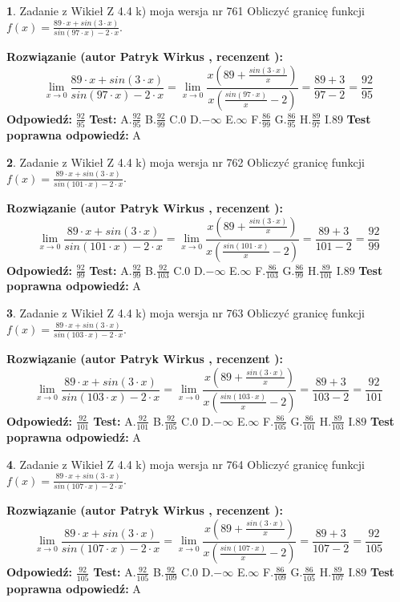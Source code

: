 \documentclass[12pt, a4paper]{article}
\theoremstyle{definition} %
\newtheorem{zad}{}
\newcommand{\zadStart}[1]{\begin{zad}#1\newline}
\newcommand{\zadStop}{\end{zad}}
\newcommand{\rozwStart}[2]{\noindent \textbf{Rozwiązanie (autor #1 , recenzent #2): }\newline}
\newcommand{\rozwStop}{\newline}
\newcommand{\odpStart}{\noindent \textbf{Odpowiedź:}\newline}
\newcommand{\odpStop}{\newline}
\newcommand{\testStart}{\noindent \textbf{Test:}\newline}
\newcommand{\testStop}{\newline}
\newcommand{\kluczStart}{\noindent \textbf{Test poprawna odpowiedź:}\newline}
\newcommand{\kluczStop}{\newline}
\begin{document}
\zadStart{Zadanie z Wikieł Z 4.4 k) moja wersja nr 761}
Obliczyć granicę funkcji $f(x)=\frac{89\cdot x +sin(3\cdot x)}{sin(97\cdot x) -2\cdot x}$.
\zadStop
\rozwStart{Patryk Wirkus}{}
$$\lim\limits_{x\to 0}\frac{89\cdot x +sin(3\cdot x)}{sin(97\cdot x) -2\cdot x}
=\lim\limits_{x\to 0}\frac{x(89+\frac{sin(3\cdot x)}{x})}{x(\frac{sin(97\cdot x)}{x}-2)}
=\frac{89+3}{97-2} = \frac{92}{95}$$
\rozwStop
\odpStart
$\frac{92}{95}$
\odpStop
\testStart
A.$\frac{92}{95}$
B.$\frac{92}{99}$
C.$0$
D.$-\infty$
E.$\infty$
F.$\frac{86}{99}$
G.$\frac{86}{95}$
H.$\frac{89}{97}$
I.$89$
\testStop
\kluczStart
A
\kluczStop



\zadStart{Zadanie z Wikieł Z 4.4 k) moja wersja nr 762}
Obliczyć granicę funkcji $f(x)=\frac{89\cdot x +sin(3\cdot x)}{sin(101\cdot x) -2\cdot x}$.
\zadStop
\rozwStart{Patryk Wirkus}{}
$$\lim\limits_{x\to 0}\frac{89\cdot x +sin(3\cdot x)}{sin(101\cdot x) -2\cdot x}
=\lim\limits_{x\to 0}\frac{x(89+\frac{sin(3\cdot x)}{x})}{x(\frac{sin(101\cdot x)}{x}-2)}
=\frac{89+3}{101-2} = \frac{92}{99}$$
\rozwStop
\odpStart
$\frac{92}{99}$
\odpStop
\testStart
A.$\frac{92}{99}$
B.$\frac{92}{103}$
C.$0$
D.$-\infty$
E.$\infty$
F.$\frac{86}{103}$
G.$\frac{86}{99}$
H.$\frac{89}{101}$
I.$89$
\testStop
\kluczStart
A
\kluczStop



\zadStart{Zadanie z Wikieł Z 4.4 k) moja wersja nr 763}
Obliczyć granicę funkcji $f(x)=\frac{89\cdot x +sin(3\cdot x)}{sin(103\cdot x) -2\cdot x}$.
\zadStop
\rozwStart{Patryk Wirkus}{}
$$\lim\limits_{x\to 0}\frac{89\cdot x +sin(3\cdot x)}{sin(103\cdot x) -2\cdot x}
=\lim\limits_{x\to 0}\frac{x(89+\frac{sin(3\cdot x)}{x})}{x(\frac{sin(103\cdot x)}{x}-2)}
=\frac{89+3}{103-2} = \frac{92}{101}$$
\rozwStop
\odpStart
$\frac{92}{101}$
\odpStop
\testStart
A.$\frac{92}{101}$
B.$\frac{92}{105}$
C.$0$
D.$-\infty$
E.$\infty$
F.$\frac{86}{105}$
G.$\frac{86}{101}$
H.$\frac{89}{103}$
I.$89$
\testStop
\kluczStart
A
\kluczStop



\zadStart{Zadanie z Wikieł Z 4.4 k) moja wersja nr 764}
Obliczyć granicę funkcji $f(x)=\frac{89\cdot x +sin(3\cdot x)}{sin(107\cdot x) -2\cdot x}$.
\zadStop
\rozwStart{Patryk Wirkus}{}
$$\lim\limits_{x\to 0}\frac{89\cdot x +sin(3\cdot x)}{sin(107\cdot x) -2\cdot x}
=\lim\limits_{x\to 0}\frac{x(89+\frac{sin(3\cdot x)}{x})}{x(\frac{sin(107\cdot x)}{x}-2)}
=\frac{89+3}{107-2} = \frac{92}{105}$$
\rozwStop
\odpStart
$\frac{92}{105}$
\odpStop
\testStart
A.$\frac{92}{105}$
B.$\frac{92}{109}$
C.$0$
D.$-\infty$
E.$\infty$
F.$\frac{86}{109}$
G.$\frac{86}{105}$
H.$\frac{89}{107}$
I.$89$
\testStop
\kluczStart
A
\kluczStop
\end{document}
